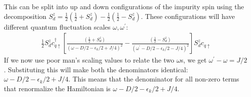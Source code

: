 \documentclass{revtex4-2}
\numberwithin{equation}{section}
\begin{document}
This can be split into up and down configurations of the impurity spin using the decomposition \(S_d^z = \frac{1}{2}\left(\frac{1}{2} + S_d^z\right) - \frac{1}{2}\left(\frac{1}{2} - S_d^z \right) \). These configurations will have different quantum fluctuation scales \(\omega, \omega^\prime\):
\begin{equation}\begin{aligned}
	\frac{1}{2}S_d^z c^\dagger_{q \uparrow}\left[\frac{\left(\frac{1}{2} + S_d^z\right)}{\left(\omega - D/2 -\epsilon_k/2 + J/4\right)^2} - \frac{\left(\frac{1}{2} - S_d^z\right)}{\left(\omega^\prime - D/2 -\epsilon_k/2 - J/4\right)^2}\right]S_d^z c_{q \uparrow}
\end{aligned}\end{equation}
If we now use poor man's scaling values to relate the two \(\omega\)s, we get \(\omega^\prime - \omega = J/2\). Substituting this will make both the denominators identical: \(\omega - D/2 -\epsilon_k/2 + J/4\). This means that the denominator for all non-zero terms that renormalize the Hamiltonian is \(\omega - D/2 - \epsilon_k/2 + J/4\).
\end{document}
